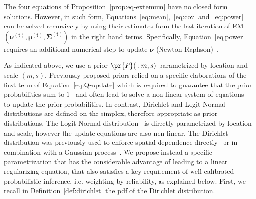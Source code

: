 \documentclass[a4paper,12pt]{article}
\begin{document}
The four equations of Proposition~\ref{prop:eq-extemum} have no closed form solutions. However, in such form, Equations~\eqref{eq:mean},~\eqref{eq:cov} and~\eqref{eq:power} can be solved recursively by using their estimates from the last iteration of EM  $(\boldsymbol{\nu^{(t)},\mu^{(t)},\Sigma^{(t)}})$ in the right hand terms. Specifically, Equation~\eqref{eq:power} requires an additional numerical step to update $\boldsymbol{\nu}$ (Newton-Raphson)~\cite{peel2000robust}.
 
As indicated above, we use a prior $\pr{P}(\cdot;m,s)$ parametrized by location and scale $(m,s)$. Previously proposed priors relied on a specific elaborations of the first term of Equation~\eqref{eq:Q-update} which is required to guarantee that the prior probabilities sum to $1$~\cite{sun2017location,nikou2010bayesian} and often lead to solve a non-linear system of equations to update the prior probabilities. In contrast, Dirichlet and Logit-Normal distributions are defined on the simplex, therefore appropriate as prior distributions. The Logit-Normal distribution~\cite{atchison1980logistic} is directly parametrized by location and scale, however the update equations are also non-linear. The Dirichlet distribution was previously used to enforce spatial dependence directly~\cite{ghosh2011spatial} or in combination with a Gaussian process~\cite{sun2017location}. We propose instead a specific parametrization that has the considerable advantage of leading to a linear regularizing equation, that also satisfies a key requirement of well-calibrated probabilistic inference, i.e. weighting by reliability, as explained below. First, we recall in Definition~\ref{def:dirichlet} the pdf of the Dirichlet distribution.
\end{document}

